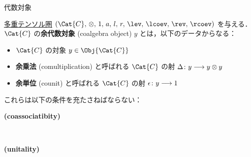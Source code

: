 \documentclass[TQFT_main]{subfiles}
\begin{document}
\begin{mydef}[label=def:algobj,breakable]{代数対象}
\begin{description}
        \begin{center}
        \end{center}
    \end{description}
    
     \tcblower

     \hyperref[def:tensorfusion-cat]{多重テンソル圏} $(\Cat{C},\, \otimes,\, 1,\, a,\, l,\, r,\, \lev,\, \lcoev,\, \rev,\, \rcoev)$ を与える．
    $ \Cat{C}$ の\textbf{余代数対象} (coalgebra object) $y$ とは，以下のデータからなる：
    \begin{itemize}
        \item $\Cat{C}$ の対象 $y \in \Obj{\Cat{C}}$ 
        \item \textbf{余乗法} (comultiplication) と呼ばれる $\Cat{C}$ の射 $\Delta \colon y \longrightarrow y \otimes y$
        \item \textbf{余単位} (counit) と呼ばれる $\Cat{C}$ の射 $\epsilon \colon y \longrightarrow 1$
    \end{itemize}
    これらは以下の条件を充たさねばならない：
    \begin{description}
        \item[\textbf{(coassociatibity)}]　
        
        \begin{center}
        \end{center}
        
        \item[\textbf{(unitality)}]　
        
        \begin{center}
        \end{center}
        

\end{description}
\end{mydef}
\end{document}
